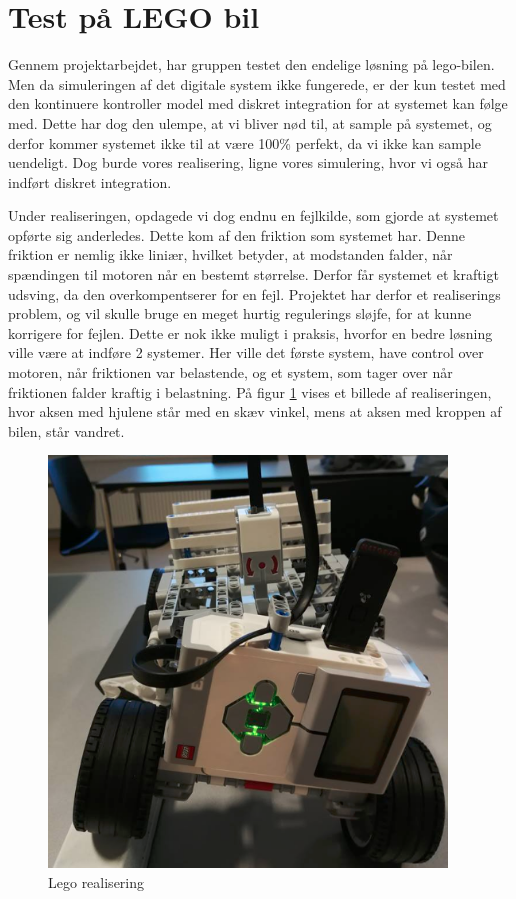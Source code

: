 \section{Test på LEGO bil}

Gennem projektarbejdet, har gruppen testet den endelige løsning på lego-bilen. Men da simuleringen af det digitale system ikke fungerede, er der kun testet med den kontinuere kontroller model med diskret integration for at systemet kan følge med. Dette har dog den ulempe, at vi bliver nød til, at sample på systemet, og derfor kommer systemet ikke til at være 100\% perfekt, da vi ikke kan sample uendeligt. Dog burde vores realisering, ligne vores simulering, hvor vi også har indført diskret integration. 

Under realiseringen, opdagede vi dog endnu en fejlkilde, som gjorde at systemet opførte sig anderledes. Dette kom af den friktion som systemet har. Denne friktion er nemlig ikke liniær, hvilket betyder, at modstanden falder, når spændingen til motoren når en bestemt størrelse. Derfor får systemet et kraftigt udsving, da den overkompentserer for en fejl. Projektet har derfor et realiserings problem, og vil skulle bruge en meget hurtig regulerings sløjfe, for at kunne korrigere for fejlen. Dette er nok ikke muligt i praksis, hvorfor en bedre løsning ville være at indføre 2 systemer. Her ville det første system, have control over motoren, når friktionen var belastende, og et system, som tager over når friktionen falder kraftig i belastning. På figur \ref{fig:lego_bil} vises et billede af realiseringen, hvor aksen med hjulene står med en skæv vinkel, mens at aksen med kroppen af bilen, står vandret. 

\begin{figure}[H]
	\centering
	\includegraphics[width = 300pt]{figur/lego_bil}
	\caption{Lego realisering}
	\label{fig:lego_bil}
\end{figure}   